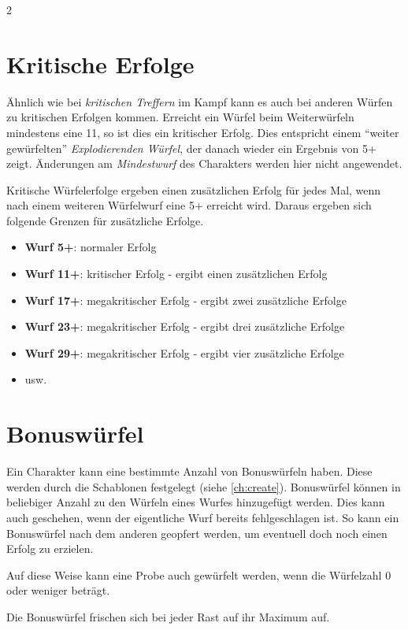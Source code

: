 \begin{multicols}{2}
\section{Kritische Erfolge}

Ähnlich wie bei \textit{kritischen Treffern} im Kampf kann es auch bei anderen Würfen zu kritischen Erfolgen kommen. Erreicht ein Würfel beim Weiterwürfeln mindestens eine 11, so ist dies ein kritischer Erfolg. Dies entspricht einem ``weiter gewürfelten'' \textit{Explodierenden Würfel}, der danach wieder ein Ergebnis von 5+ zeigt. Änderungen am \textit{Mindestwurf} des Charakters werden hier nicht angewendet.

Kritische Würfelerfolge ergeben einen zusätzlichen Erfolg für jedes Mal, wenn nach einem weiteren Würfelwurf eine 5+ erreicht wird. Daraus ergeben sich folgende Grenzen für zusätzliche Erfolge.

\begin{itemize}
    \item \textbf{Wurf 5+}: normaler Erfolg
    \item \textbf{Wurf 11+}: kritischer Erfolg - ergibt einen zusätzlichen Erfolg
    \item \textbf{Wurf 17+}: megakritischer Erfolg - ergibt zwei zusätzliche Erfolge
    \item \textbf{Wurf 23+}: megakritischer Erfolg - ergibt drei zusätzliche Erfolge
    \item \textbf{Wurf 29+}: megakritischer Erfolg - ergibt vier zusätzliche Erfolge
    \item usw.
\end{itemize}

\section{Bonuswürfel}

Ein Charakter kann eine bestimmte Anzahl von Bonuswürfeln haben. Diese werden durch die Schablonen festgelegt (siehe \cref{ch:create}). Bonuswürfel können in beliebiger Anzahl zu den Würfeln eines Wurfes hinzugefügt werden. Dies kann auch geschehen, wenn der eigentliche Wurf bereits fehlgeschlagen ist. So kann ein Bonuswürfel nach dem anderen geopfert werden, um eventuell doch noch einen Erfolg zu erzielen.

Auf diese Weise kann eine Probe auch gewürfelt werden, wenn die Würfelzahl 0 oder weniger beträgt.

Die Bonuswürfel frischen sich bei jeder Rast auf ihr Maximum auf.


\end{multicols}
